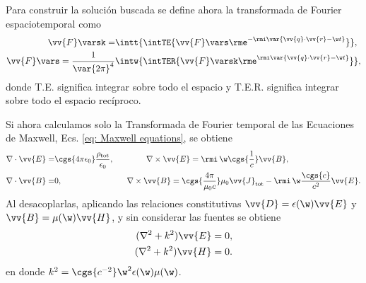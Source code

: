 \label{AppendixScalarPotentials}
Para construir la solución buscada se define ahora la transformada de Fourier espaciotemporal como
\begin{align}
\vv{F}\varsk = &\intt{\intTE{ \vv{F}\vars \rme^{-\rmi \var{\vv{q}\cdot\vv{r}-\w t}} }},\nonumber \\
\vv{F}\vars = \frac{1}{\var{2\pi}^4}&\intw{\intTER{ \vv{F}\varsk \rme^{\rmi\var{\vv{q}\cdot\vv{r}-\w t}} }},
\end{align}
donde T.E. significa integrar sobre todo el espacio y T.E.R. significa integrar sobre todo el espacio recíproco. 

Si ahora calculamos solo la Transformada de Fourier temporal de las Ecuaciones de Maxwell, Ecs. \eqref{eq: Maxwell equations}, se obtiene
\begin{align}
\nabla\cdot\vv{E} =& \cgs{4\pi\epsilon_0}\frac{\rho_{\text{tot}}}{\epsilon_0}, \qquad \qquad \nabla\times\vv{E}= \rmi \,\w\cgs{\frac{1}{c}}\vv{B}, \nonumber \\
\nabla\cdot\vv{B} =& 0, \qquad \qquad \qquad \qquad \nabla\times\vv{B}=\cgs{\frac{4\pi}{\mu_0 c}}\mu_0\vv{J}_{\text{tot}}- \rmi \, \w\frac{\cgs{c}}{c^2}\vv{E}.
\label{eq: Maxwell equations freq}
\end{align}
Al desacoplarlas, aplicando las relaciones constitutivas $\vv{D}=\epsilon(\w)\vv{E}$ y $\vv{B} = \mu(\w) \vv{H}$, y sin considerar las fuentes se obtiene
\begin{align*}
(\nabla^2 + k^2)\vv{E} = 0, \\
(\nabla^2 + k^2)\vv{H} = 0.
\end{align*}
en donde $k^2= \cgs{c^{-2}} \w^2 \epsilon(\w) \mu(\w)$.

